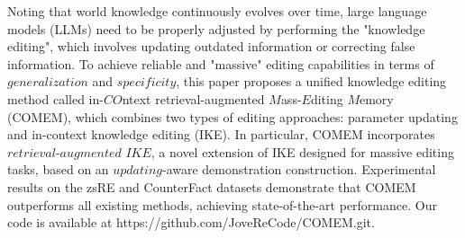 Noting that world knowledge continuously evolves over time, large language models (LLMs) need to be properly adjusted by performing the "knowledge editing", which involves updating outdated information or correcting false information. To achieve  reliable and "massive" editing capabilities in terms of $\textit{generalization}$ and $\textit{specificity}$, this paper proposes a unified knowledge editing method called in-${CO}$ntext retrieval-augmented ${M}$ass-${E}$diting ${M}$emory (COMEM), which combines two types of editing approaches: parameter updating and in-context knowledge editing (IKE). In particular, COMEM incorporates $\textit{retrieval-augmented IKE}$, a novel extension of IKE designed for  massive editing tasks, based on an $\textit{updating}$-aware demonstration construction. Experimental results on the zsRE and CounterFact datasets demonstrate that COMEM outperforms all existing methods, achieving state-of-the-art performance. Our code is available at https://github.com/JoveReCode/COMEM.git.